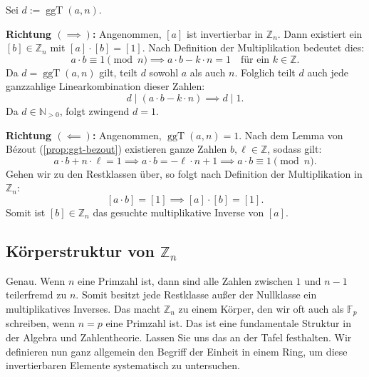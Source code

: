 \begin{math-stroke}
\begin{short-proof}
Sei $d := \operatorname{ggT}(a, n)$.

\par\vspace{1ex}\noindent
\textbf{Richtung $(\implies)$:}
Angenommen, $[a]$ ist invertierbar in $\mathbb{Z}_n$. Dann existiert ein $[b] \in \mathbb{Z}_n$ mit $[a] \cdot [b] = [1]$. Nach Definition der Multiplikation bedeutet dies:
\[
a \cdot b \equiv 1 \pmod n \implies a \cdot b - k \cdot n = 1 \quad \text{für ein } k \in \mathbb{Z}.
\]
Da $d = \operatorname{ggT}(a, n)$ gilt, teilt $d$ sowohl $a$ als auch $n$. Folglich teilt $d$ auch jede ganzzahlige Linearkombination dieser Zahlen:
\[
d \mid (a \cdot b - k \cdot n) \implies d \mid 1.
\]
Da $d \in \mathbb{N}_{>0}$, folgt zwingend $d = 1$.

\par\vspace{1ex}\noindent
\textbf{Richtung $(\impliedby)$:}
Angenommen, $\operatorname{ggT}(a, n) = 1$. Nach dem Lemma von Bézout (\cref{prop:ggt-bezout}) existieren ganze Zahlen $b, \ell \in \mathbb{Z}$, sodass gilt:
\[
a \cdot b + n \cdot \ell = 1 \implies a \cdot b = -\ell \cdot n + 1 \implies a \cdot b \equiv 1 \pmod n.
\]
Gehen wir zu den Restklassen über, so folgt nach Definition der Multiplikation in $\mathbb{Z}_n$:
\[
[a \cdot b] = [1] \implies [a] \cdot [b] = [1].
\]
Somit ist $[b] \in \mathbb{Z}_n$ das gesuchte multiplikative Inverse von $[a]$.
\end{short-proof}
\end{math-stroke}

\subsection{Körperstruktur von \texorpdfstring{$\mathbb{Z}_n$}{Zn}}

\begin{spoken-clean}[00:30:56 - 00:33:13]
Genau. Wenn $n$ eine Primzahl ist, dann sind alle Zahlen zwischen $1$ und $n-1$ teilerfremd zu $n$. Somit besitzt jede Restklasse außer der Nullklasse ein multiplikatives Inverses. Das macht $\mathbb{Z}_n$ zu einem Körper, den wir oft auch als $\mathbb{F}_p$ schreiben, wenn $n = p$ eine Primzahl ist. Das ist eine fundamentale Struktur in der Algebra und Zahlentheorie. Lassen Sie uns das an der Tafel festhalten. Wir definieren nun ganz allgemein den Begriff der Einheit in einem Ring, um diese invertierbaren Elemente systematisch zu untersuchen.
\end{spoken-clean}

